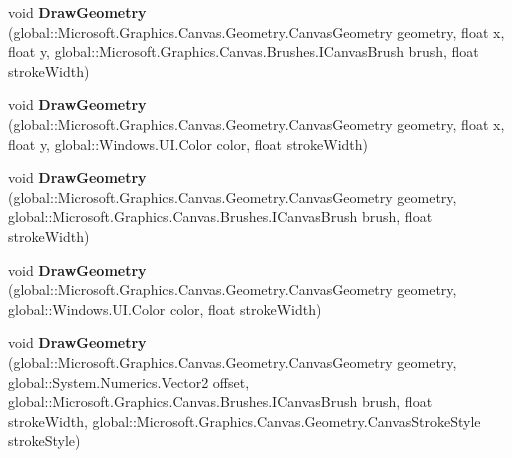 \begin{DoxyCompactItemize}
void {\bfseries Draw\+Geometry} (global\+::\+Microsoft.\+Graphics.\+Canvas.\+Geometry.\+Canvas\+Geometry geometry, float x, float y, global\+::\+Microsoft.\+Graphics.\+Canvas.\+Brushes.\+I\+Canvas\+Brush brush, float stroke\+Width)
\item 
\mbox{\label{interface_microsoft_1_1_graphics_1_1_canvas_1_1_i_canvas_drawing_session_af7fba73a063114677303044d57a07932}} 
void {\bfseries Draw\+Geometry} (global\+::\+Microsoft.\+Graphics.\+Canvas.\+Geometry.\+Canvas\+Geometry geometry, float x, float y, global\+::\+Windows.\+U\+I.\+Color color, float stroke\+Width)
\item 
\mbox{\label{interface_microsoft_1_1_graphics_1_1_canvas_1_1_i_canvas_drawing_session_a172a412716c5be1cdcbdfcc468f103a0}} 
void {\bfseries Draw\+Geometry} (global\+::\+Microsoft.\+Graphics.\+Canvas.\+Geometry.\+Canvas\+Geometry geometry, global\+::\+Microsoft.\+Graphics.\+Canvas.\+Brushes.\+I\+Canvas\+Brush brush, float stroke\+Width)
\item 
\mbox{\label{interface_microsoft_1_1_graphics_1_1_canvas_1_1_i_canvas_drawing_session_a86cf58c7718a6a862f8e7ecb5d2624cf}} 
void {\bfseries Draw\+Geometry} (global\+::\+Microsoft.\+Graphics.\+Canvas.\+Geometry.\+Canvas\+Geometry geometry, global\+::\+Windows.\+U\+I.\+Color color, float stroke\+Width)
\item 
\mbox{\label{interface_microsoft_1_1_graphics_1_1_canvas_1_1_i_canvas_drawing_session_a77054d34a841a6c3d2d6c6f56d628aae}} 
void {\bfseries Draw\+Geometry} (global\+::\+Microsoft.\+Graphics.\+Canvas.\+Geometry.\+Canvas\+Geometry geometry, global\+::\+System.\+Numerics.\+Vector2 offset, global\+::\+Microsoft.\+Graphics.\+Canvas.\+Brushes.\+I\+Canvas\+Brush brush, float stroke\+Width, global\+::\+Microsoft.\+Graphics.\+Canvas.\+Geometry.\+Canvas\+Stroke\+Style stroke\+Style)
\item 
\mbox{\label{interface_microsoft_1_1_graphics_1_1_canvas_1_1_i_canvas_drawing_session_a274e3b45ea98448ed581f7fcf2fa9851}} 

\end{DoxyCompactItemize}
